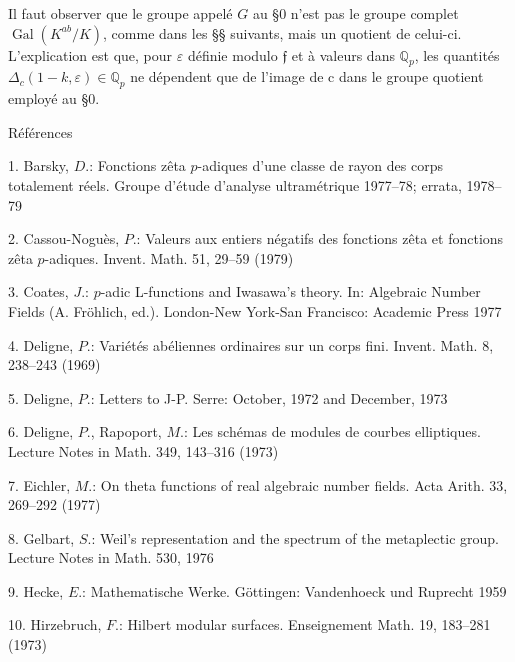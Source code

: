\documentclass[11pt]{article}
\begin{document}
Il faut observer que le groupe appelé \(G\) au §0 n’est pas le groupe complet \(\operatorname{Gal}(K^{ab}/K)\), comme dans les §§ suivants, mais un quotient de celui-ci. L’explication est que, pour \(\varepsilon \) définie modulo \(𝔣\) et à valeurs dans \(\mathbb{Q}_{p}\), les quantités \(\Delta _{c}(1-k,\varepsilon )\in \mathbb{Q}_{p}\) ne dépendent que de l’image de c dans le groupe quotient employé au §0.\par
\par
\begingroup\small\setlength{\parskip}{.15\baselineskip}
Références\par
\par
1. Barsky, \(D\).: Fonctions zêta \(p\)-adiques d’une classe de rayon des corps totalement réels. Groupe d’étude d’analyse ultramétrique 1977--78; errata, 1978--79\par
\par
2. Cassou-Noguès, \(P\).: Valeurs aux entiers négatifs des fonctions zêta et fonctions zêta \(p\)-adiques. Invent. Math. 51, 29--59 (1979)\par
\par
3. Coates, \(J\).: \(p\)-adic L-functions and Iwasawa’s theory. In: Algebraic Number Fields (A. Fröhlich, ed.). London-New York-San Francisco: Academic Press 1977\par
\par
4. Deligne, \(P\).: Variétés abéliennes ordinaires sur un corps fini. Invent. Math. 8, 238--243 (1969)\par
\par
5. Deligne, \(P\).: Letters to J-P. Serre: October, 1972 and December, 1973\par
\par
6. Deligne, \(P\)., Rapoport, \(M\).: Les schémas de modules de courbes elliptiques. Lecture Notes in Math. 349, 143--316 (1973)\par
\par
7. Eichler, \(M\).: On theta functions of real algebraic number fields. Acta Arith. 33, 269--292 (1977)\par
\par
8. Gelbart, \(S\).: Weil’s representation and the spectrum of the metaplectic group. Lecture Notes in Math. 530, 1976\par
\par
9. Hecke, \(E\).: Mathematische Werke. Göttingen: Vandenhoeck und Ruprecht 1959\par
\par
10. Hirzebruch, \(F\).: Hilbert modular surfaces. Enseignement Math. 19, 183--281 (1973)\par
\end{document}
